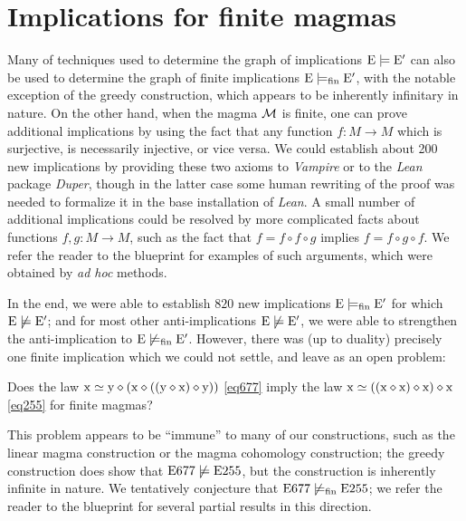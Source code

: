 \section{Implications for finite magmas}\label{austin-sec}

Many of techniques used to determine the graph of implications $\mathrm{E} \models \mathrm{E}'$ can also be used to determine the graph of finite implications $\mathrm{E} \models_{\mathrm{fin}} \mathrm{E}'$, with the notable exception of the greedy construction, which appears to be inherently infinitary in nature.  On the other hand, when the magma ${\mathcal{M}}$ is finite, one can prove additional implications by using the fact that any function $f \colon M \to M$ which is surjective, is necessarily injective, or vice versa.  We could establish about 200 new implications by providing these two axioms to \emph{Vampire} or to the \emph{Lean} package \emph{Duper}, though in the latter case some human rewriting of the proof was needed to formalize it in the base installation of \emph{Lean}.  A small number of additional implications could be resolved by more complicated facts about functions $f,g \colon M \to M$, such as the fact that $f = f \circ f \circ g$ implies $f = f \circ g \circ f$.  We refer the reader to the blueprint for examples of such arguments, which were obtained by \emph{ad hoc} methods.

In the end, we were able to establish $820$ new implications $\mathrm{E} \models_{\mathrm{fin}} \mathrm{E}'$ for which $\mathrm{E} \not \models \mathrm{E}'$; and for most other anti-implications $\mathrm{E} \not \models \mathrm{E}'$, we were able to strengthen the anti-implication to $\mathrm{E} \not \models_{\mathrm{fin}} \mathrm{E}'$.  However, there was (up to duality) precisely one finite implication which we could not settle, and leave as an open problem:

\begin{problem}  Does the law $\mathrm{x} \simeq \mathrm{y} \diamond (\mathrm{x} \diamond ((\mathrm{y} \diamond \mathrm{x}) \diamond \mathrm{y}))$ \eqref{eq677} imply the law $\mathrm{x} \simeq ((\mathrm{x} \diamond \mathrm{x}) \diamond \mathrm{x}) \diamond \mathrm{x}$ \eqref{eq255} for finite magmas?
\end{problem}

This problem appears to be ``immune'' to many of our constructions, such as the linear magma construction or the magma cohomology construction; the greedy construction does show that $\mathrm{E}677 \not \models \mathrm{E}255$, but the construction is inherently infinite in nature.  We tentatively conjecture that $\mathrm{E}677 \not \models_{\mathrm{fin}} \mathrm{E}255$; we refer the reader to the blueprint for several partial results in this direction.
